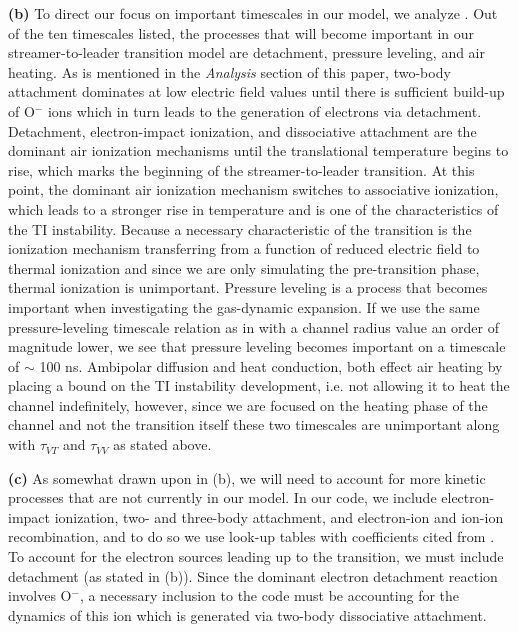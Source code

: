 \documentclass[]{article}
\begin{document}
	 \textbf{(b)} To direct our focus on important timescales in our model, we  analyze \citet[Table 4]{daSilva:2013a}. Out of the ten timescales listed, the processes that will become important in our streamer-to-leader transition model are detachment, pressure leveling, and air heating. As is mentioned in the \textit{Analysis} section of this paper, two-body attachment dominates at low electric field values until there is sufficient build-up of O$^-$ ions which in turn leads to the generation of electrons via detachment. Detachment, electron-impact ionization, and dissociative attachment are the dominant air ionization mechanisms until the translational temperature begins to rise, which marks the beginning of the streamer-to-leader transition. At this point, the dominant air ionization mechanism switches to associative ionization, which leads to a stronger rise in temperature and is one of the characteristics of the TI instability. Because a necessary characteristic of the transition is the ionization mechanism transferring from a function of reduced electric field to thermal ionization and since we are only simulating the pre-transition phase, thermal ionization is unimportant. Pressure leveling is a process that becomes important when investigating the gas-dynamic expansion. If we use the same pressure-leveling timescale relation as in \citet{daSilva:2013a} with a channel radius value an order of magnitude lower, we see that pressure leveling becomes important on a timescale of $\sim$ 100 ns. Ambipolar diffusion and heat conduction, both effect air heating by placing a bound on the TI instability development, i.e. not allowing it to heat the channel indefinitely, however, since we are focused on the heating phase of the channel and not the transition itself these two timescales are unimportant along with $\tau_{VT}$ and $\tau_{VV}$ as stated above. 
	 
	 \textbf{(c)} As somewhat drawn upon in (b), we will need to account for more kinetic processes that are not currently in our model. In our code, we include electron-impact ionization, two- and three-body attachment, and electron-ion and ion-ion recombination, and to do so we use look-up tables with coefficients cited from \citet{Morrow:1997b}. To account for the electron sources leading up to the transition, we must include detachment (as stated in (b)). Since the dominant electron detachment reaction involves O$^-$, a necessary inclusion to the code must be accounting for the dynamics of this ion which is generated via two-body dissociative attachment.  
	 
\end{document}
